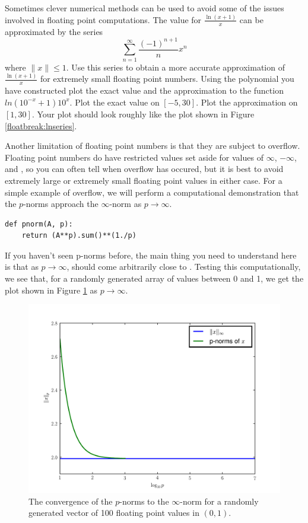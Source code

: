 \begin{problem}
Sometimes clever numerical methods can be used to avoid some of the issues involved in floating point computations.
The value for $\frac{\ln \left(x+1\right)}{x}$ can be approximated by the series
\[
\sum_{n=1}^{\infty} \frac{\left( -1 \right)^{n+1}}{n} x^n
\]
where $\| x \| \leq 1$.
Use this series to obtain a more accurate approximation of $\frac{\ln \left(x+1\right)}{x}$ for extremely small floating point numbers.
Using the polynomial you have constructed plot the exact value and the approximation to the function $ln \left( 10^{-x} + 1 \right)10^{x}$.
Plot the exact value on $[-5, 30]$.
Plot the approximation on $[1, 30]$.
Your plot should look roughly like the plot shown in Figure \ref{floatbreak:lnseries}.
\end{problem}

Another limitation of floating point numbers is that they are subject to overflow.
Floating point numbers do have restricted values set aside for values of $\infty$, $-\infty$, and , so you can often tell when overflow has occured, but it is best to avoid extremely large or extremely small floating point values in either case.
For a simple example of overflow, we will perform a computational demonstration that the $p$-norms approach the $\infty$-norm as $p \rightarrow \infty$.
\begin{lstlisting}
def pnorm(A, p):
    return (A**p).sum()**(1./p)
\end{lstlisting}
If you haven't seen p-norms before, the main thing you need to understand here is that as $p \rightarrow \infty$,  should come arbitrarily close to .
Testing this computationally, we see that, for a randomly generated array of values between 0 and 1, we get the plot shown in Figure \ref{pnorm_convergence} as $p \rightarrow \infty$.

\begin{figure}
\includegraphics[width=\textwidth]{pnorm_convergence.pdf}
\caption{The convergence of the $p$-norms to the $\infty$-norm for a randomly generated vector of 100 floating point values in $(0,1)$.}
\label{pnorm_convergence}
\end{figure}

